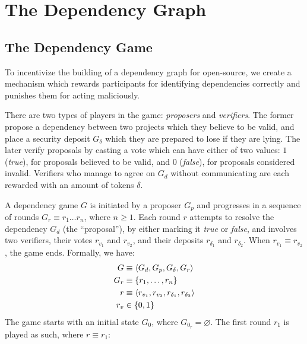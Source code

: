 \section{The Dependency Graph}
\subsection{The Dependency Game}


To incentivize the building of a dependency graph for open-source, we create a
mechanism which rewards participants for identifying dependencies correctly and
punishes them for acting maliciously.

There are two types of players in the game: \emph{proposers} and
\emph{verifiers}.  The former propose a dependency between two projects which
they believe to be valid, and place a security deposit $G_{\delta}$ which they
are prepared to lose if they are lying. The later verify proposals by casting a
vote which can have either of two values: $1$ (\emph{true}), for proposals
believed to be valid, and $0$ (\emph{false}), for proposals considered
invalid. Verifiers who manage to agree on $G_d$ without communicating
are each rewarded with an amount of tokens $\delta$.


A dependency game $G$ is initiated by a proposer $G_p$ and progresses in a
sequence of rounds $G_r \equiv r_1 \dots r_n$, where $n \geqslant 1$. Each
round $r$ attempts to resolve the dependency $G_d$ (the ``proposal''), by
either marking it \emph{true} or \emph{false}, and involves two verifiers,
their votes $r_{v_1}$ and $r_{v_2}$, and their deposits $r_{\delta_1}$ and
$r_{\delta_2}$. When $r_{v_1} \equiv r_{v_2}$, the game ends.  Formally, we
have:
\begin{align*}
    G      & \equiv \langle G_d, G_p, G_{\delta}, G_r \rangle \\
    G_r    & \equiv \{r_1, \dots, r_n\} \\
    r      & \equiv \langle r_{v_1}, r_{v_2}, r_{\delta_1}, r_{\delta_2} \rangle \\
    r_v    & \in \{0, 1\} \\
\end{align*}
The game starts with an initial state $G_0$, where $G_{0_r} = \varnothing$.
The first round $r_1$ is played as such, where $r \equiv r_1$:


